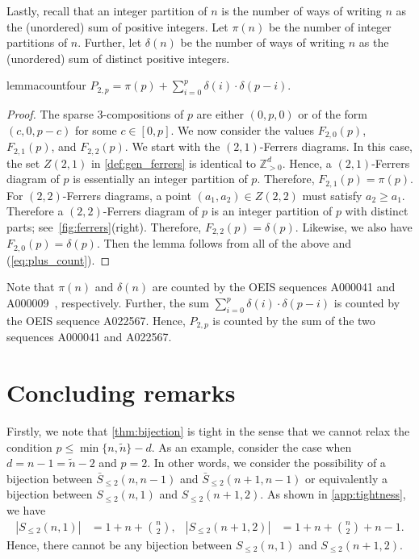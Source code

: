 \documentclass[a4paper,11pt]{amsart}
\newcommand{\Z}{\mathbb{Z}}
\newcommand{\tn}{\tilde{n}}
\begin{document}
Lastly, recall that an integer partition of $n$ is the number of ways of writing $n$ as the (unordered) sum of positive integers.
Let $\pi(n)$ be the number of integer partitions of $n$.
Further, let $\delta(n)$ be the number of ways of writing $n$ as the (unordered) sum of distinct positive integers.

\begin{restatable}{lemma}{countfour}
    $P_{2,p} = \pi(p) + \sum^{p}_{i=0} \delta(i) \cdot \delta(p-i)$.
\end{restatable}

\begin{proof}
	The sparse 3-compositions of $p$ are either $(0,p,0)$ or of the form $(c,0,p-c)$ for some $c \in [0,p]$. 
    We now consider the values $F_{2,0}(p)$, $F_{2,1}(p)$, and $F_{2,2}(p)$.
    We start with the $(2,1)$-Ferrers diagrams.
    In this case, the set $Z(2,1)$ in \cref{def:gen_ferrers} is identical to $\Z^d_{>0}$.
    Hence, a $(2,1)$-Ferrers diagram of $p$ is essentially an integer partition of $p$.
    Therefore, $F_{2,1}(p) = \pi(p)$.
    For $(2,2)$-Ferrers diagrams, a point $(a_1,a_2) \in Z(2,2)$ must satisfy $a_2 \geq a_1$.
    Therefore a $(2,2)$-Ferrers diagram of $p$ is an integer partition of $p$ with distinct parts; see~\cref{fig:ferrers}(right).
    Therefore, $F_{2,2}(p) = \delta(p)$.
    Likewise, we also have $F_{2,0}(p) = \delta(p)$.
    Then the lemma follows from all of the above and (\ref{eq:plus_count}).
\end{proof}

Note that $\pi(n)$ and $\delta(n)$ are counted by the OEIS sequences A000041 and A000009~\cite{oeis}, respectively.
Further, the sum $\sum^{p}_{i=0} \delta(i) \cdot \delta(p-i)$ is counted by the OEIS sequence A022567.
Hence, $P_{2,p}$ is counted by the sum of the two sequences A000041 and A022567.

\section{Concluding remarks}
\label{sec:conclusions}

Firstly, we note that \cref{thm:bijection} is tight in the sense that we cannot relax the condition $p \leq \min\{n, \tn\} - d$.
As an example, consider the case when $d = n-1 = \tn - 2$ and $p = 2$.
In other words, we consider the possibility of a bijection between $\bar{S}_{\leq 2}(n,n-1)$ and $\bar{S}_{\leq 2}(n+1,n-1)$ or equivalently a bijection between $S_{\leq 2}(n,1)$ and $S_{\leq 2}(n+1,2)$.
As shown in \cref{app:tightness}, we have
\begin{align*}
    |S_{\leq 2}(n,1)| &= 1 + n + {n \choose 2},
    &|S_{\leq 2}(n+1,2)| &= 1 + n + {n \choose 2} + n - 1.
\end{align*}
Hence, there cannot be any bijection between $S_{\leq 2}(n,1)$ and $S_{\leq 2}(n+1,2)$.
\end{document}
